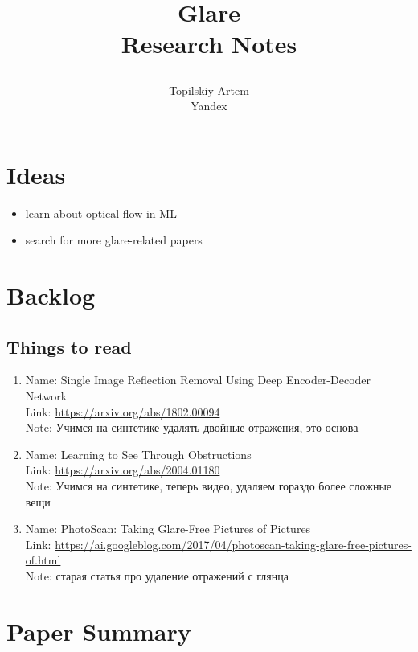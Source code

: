 \documentclass[a4paper, 12pt]{article}
\begin{document}

\title{
Glare
\\
\Large{Research Notes}
\\
\author{
Topilskiy Artem\\
Yandex
}
}
\maketitle

\section{Ideas}

\begin{itemize}
\item learn about optical flow in ML
\item search for more glare-related papers
\end{itemize}

\section{Backlog}

\subsection{Things to read}
\begin{enumerate}

\item
Name: Single Image Reflection Removal Using Deep Encoder-Decoder Network \\
Link: \url{https://arxiv.org/abs/1802.00094} \\
Note: Учимся на синтетике удалять двойные отражения, это основа

\item
Name: Learning to See Through Obstructions \\
Link: \url{https://arxiv.org/abs/2004.01180} \\
Note: Учимся на синтетике, теперь видео, удаляем гораздо более сложные вещи

\item
Name: PhotoScan: Taking Glare-Free Pictures of Pictures \\
Link: \url{https://ai.googleblog.com/2017/04/photoscan-taking-glare-free-pictures-of.html} \\
Note: старая статья про удаление отражений с глянца

\end{enumerate}

\newpage
\section{Paper Summary}

\end{document}
